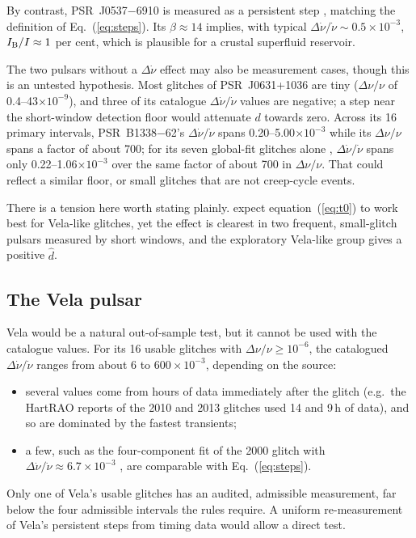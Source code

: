 \documentclass[fleqn,usenatbib]{mnras}
\newcommand{\dnu}{\Delta\nu/\nu}
\newcommand{\dnud}{\Delta\dot\nu/\dot\nu}
\newcommand{\dhat}{\hat d}
\newcommand{\psr}[1]{PSR~#1}
\begin{document}
By contrast, \psr{J0537$-$6910} is measured as a persistent step
\citep{antonopoulou2018}, matching the definition of Eq.~(\ref{eq:steps}).
Its $\beta\approx14$ implies, with typical $\dnud\sim0.5\times10^{-3}$,
$I_{\rm B}/I\approx1$ per cent, which is plausible for a crustal superfluid
reservoir.

The two pulsars without a $\Delta\dot\nu$ effect may also be measurement
cases, though this is an untested hypothesis. Most glitches of
\psr{J0631+1036} are tiny ($\dnu$ of 0.4--43$\times10^{-9}$), and three of its
catalogue $\dnud$ values are negative; a step near the short-window
detection floor would attenuate $d$ towards zero. Across its 16 primary
intervals, \psr{B1338$-$62}'s $\dnud$ spans 0.20--5.00$\times10^{-3}$
while its $\dnu$ spans a factor of about 700; for its seven global-fit
glitches alone \citep{lower2021}, $\dnud$ spans only
0.22--1.06$\times10^{-3}$ over the same factor of about 700 in $\dnu$. That could reflect a similar floor, or small glitches
that are not creep-cycle events.

There is a tension here worth stating plainly. \citet{zhou2022} expect
equation~(\ref{eq:t0}) to work best for Vela-like glitches, yet the
effect is clearest in two frequent, small-glitch pulsars measured by short
windows, and the exploratory Vela-like group gives a positive $\dhat$.

\subsection{The Vela pulsar}\label{sec:vela}
Vela would be a natural out-of-sample test, but it cannot be used with the
catalogue values. For its 16 usable glitches with
$\dnu\geq10^{-6}$, the catalogued $\dnud$ ranges from about $6$ to
$600\times10^{-3}$, depending on the source:
\begin{itemize}
\item several values come from hours of data immediately after the glitch
(e.g.\ the HartRAO reports of the 2010 and 2013 glitches used 14 and 9\,h of
data), and so are dominated by the fastest transients;
\item a few, such as the four-component fit of the 2000 glitch with
$\dnud\approx6.7\times10^{-3}$ \citep{dodson2002}, are comparable with
Eq.~(\ref{eq:steps}).
\end{itemize}
Only one of Vela's usable glitches has an audited, admissible
measurement, far below the four admissible intervals the rules require. A uniform re-measurement of Vela's persistent steps from timing
data would allow a direct test.
\end{document}
